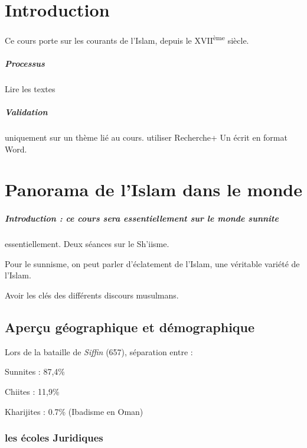 \chapter{Introduction}


Ce cours porte sur les courants de l'Islam, depuis le XVII\textsuperscript{ème} siècle.

\paragraph{Processus}
Lire les textes


\paragraph{Validation} uniquement sur un thème lié au cours. utiliser Recherche+
Un écrit en format Word.

\chapter{Panorama de l'Islam dans le monde}

\paragraph{Introduction : ce cours sera essentiellement sur le monde sunnite} essentiellement. Deux séances sur le Sh'iisme. 
\begin{Synthesis}
Pour le sunnisme, on peut parler d'éclatement de l'Islam, une véritable variété de l'Islam.
\end{Synthesis}
Avoir les clés des différents discours musulmans. 


\section{Aperçu géographique et démographique}

Lors de la bataille de \textit{Siffin} (657), séparation entre : 
\bi
\item Sunnites : 87,4\%
\item Chiites : 11,9\%
\item Kharijites : 0.7\% (Ibadisme en Oman)
\ei 

\subsection{les écoles Juridiques}

